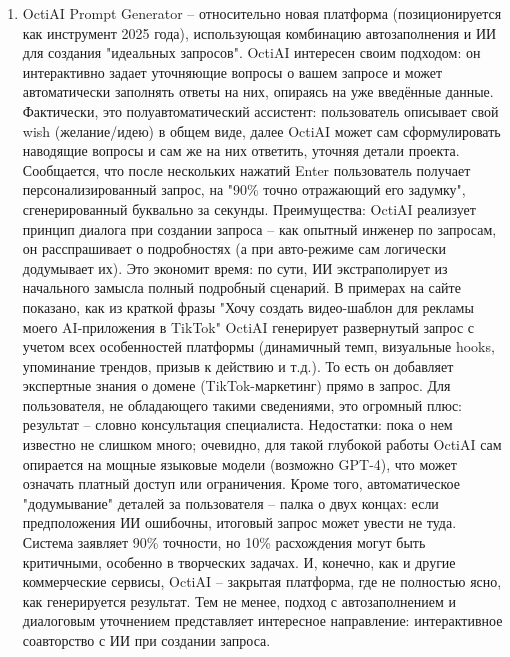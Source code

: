 \begin{enumerate}[label=\arabic*]
\item OctiAI Prompt Generator – относительно новая платформа (позиционируется как инструмент 2025 года), использующая комбинацию автозаполнения и ИИ для создания "идеальных запросов". OctiAI интересен своим подходом: он интерактивно задает уточняющие вопросы о вашем запросе и может автоматически заполнять ответы на них, опираясь на уже введённые данные\cite{octiai:2025}. Фактически, это полуавтоматический ассистент: пользователь описывает свой wish (желание/идею) в общем виде, далее OctiAI может сам сформулировать наводящие вопросы и сам же на них ответить, уточняя детали проекта. Сообщается, что после нескольких нажатий Enter пользователь получает персонализированный запрос, на "90\% точно отражающий его задумку", сгенерированный буквально за секунды\cite{octiai:2025}. Преимущества: OctiAI реализует принцип диалога при создании запроса – как опытный инженер по запросам, он расспрашивает о подробностях (а при авто-режиме сам логически додумывает их). Это экономит время: по сути, ИИ экстраполирует из начального замысла полный подробный сценарий. В примерах на сайте показано, как из краткой фразы "Хочу создать видео-шаблон для рекламы моего AI-приложения в TikTok" OctiAI генерирует развернутый запрос с учетом всех особенностей платформы (динамичный темп, визуальные hooks, упоминание трендов, призыв к действию и т.д.)\cite{octiai:2025}. То есть он добавляет экспертные знания о домене (TikTok-маркетинг) прямо в запрос. Для пользователя, не обладающего такими сведениями, это огромный плюс: результат – словно консультация специалиста. Недостатки: пока о нем известно не слишком много; очевидно, для такой глубокой работы OctiAI сам опирается на мощные языковые модели (возможно GPT-4), что может означать платный доступ или ограничения. Кроме того, автоматическое "додумывание" деталей за пользователя – палка о двух концах: если предположения ИИ ошибочны, итоговый запрос может увести не туда. Система заявляет 90\% точности, но 10\% расхождения могут быть критичными, особенно в творческих задачах. И, конечно, как и другие коммерческие сервисы, OctiAI – закрытая платформа, где не полностью ясно, как генерируется результат. Тем не менее, подход с автозаполнением и диалоговым уточнением представляет интересное направление: интерактивное соавторство с ИИ при создании запроса.
\end{enumerate}

